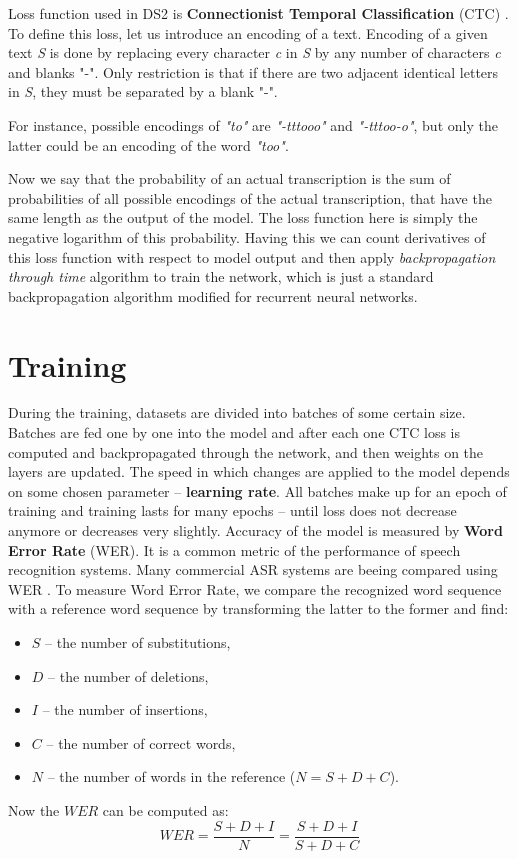 \documentclass[licencjacka,en]{pracamgr}
\begin{document}
Loss function used in DS2 is \textbf{Connectionist Temporal Classification} (CTC) \cite{DS3}. To define this loss, let us introduce an encoding of a text. Encoding of a given text \textit{S} is done by replacing every character \textit{c} in \textit{S} by any number of characters \textit{c} and blanks "-". Only restriction is that if there are two adjacent identical letters in \textit{S}, they must be separated by a blank "-".

For instance, possible encodings of \textit{"to"} are \textit{"-tttooo"} and \textit{"-tttoo-o"}, but only the latter could be an encoding of the word \textit{"too"}.

Now we say that the probability of an actual transcription is the sum of probabilities of all possible encodings of the actual transcription, that have the same length as the output of the model. The loss function here is simply the negative logarithm of this probability. Having this we can count derivatives of this loss function with respect to model output and then apply \textit{backpropagation through time} algorithm to train the network, which is just a standard backpropagation algorithm modified for recurrent neural networks.

\section{Training} \label{sec:trainig}
During the training, datasets are divided into batches of some certain size. Batches are fed one by one into the model and after each one CTC loss is computed and backpropagated through the network, and then weights on the layers are updated. The speed in which changes are applied to the model depends on some chosen parameter -- \textbf{learning rate}. All batches make up for an epoch of training and training lasts for many epochs -- until loss does not decrease anymore or decreases very slightly.
Accuracy of the model is measured by \textbf{Word Error Rate} (WER). It is a common metric of the performance of speech recognition systems. Many commercial ASR systems are beeing compared using WER \cite{DS8}. To measure Word Error Rate, we compare the recognized word sequence with a reference word sequence by transforming the latter to the former and find:

\begin{itemize}
  \item $S$ -- the number of substitutions,
  \item $D$ -- the number of deletions,
  \item $I$ -- the number of insertions,
  \item $C$ -- the number of correct words,
  \item $N$ -- the number of words in the reference ($N=S+D+C$).
\end{itemize}
Now the $WER$ can be computed as:
$$
WER = \frac{S + D + I}{N} = \frac{S + D + I}{S + D + C}
$$
\end{document}

